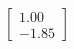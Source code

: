 \documentclass[preview]{standalone}
\begin{document}
\begin{align*}
\begin{bmatrix} 1.00 \\ -1.85 \end{bmatrix}
\end{align*}
\end{document}
